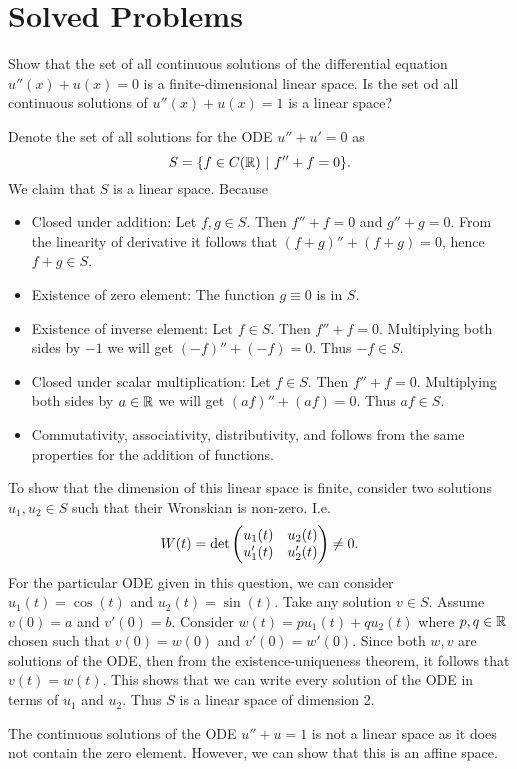 \section{Solved Problems}

\begin{problem}
	Show that the set of all continuous solutions of the differential equation $ u''(x) + u(x) = 0 $ is a finite-dimensional linear space. Is the set od all continuous solutions of $ u''(x)+u(x) = 1$ is a linear space?
\end{problem}
\begin{solution}
	Denote the set of all solutions for the ODE $ u'' + u' = 0 $ as 
	\[ S = \{f \in C(\mathbb{R})\ |\ f'' + f = 0\}. \]
	We claim that $ S $ is a linear space. Because
	\begin{itemize}[noitemsep]
		\item Closed under addition: Let $ f,g \in S $. Then $ f''+f = 0 $ and $ g'' + g = 0 $. From the linearity of derivative it follows that $ (f+g) '' + (f+g) = 0  $, hence $ f+g \in S $.
		\item Existence of zero element: The function $ g \equiv 0 $ is in $ S $.
		\item Existence of inverse element: Let $ f \in S $. Then $ f'' + f = 0 $. Multiplying both sides by $ -1 $ we will get $ (-f)'' + (-f) = 0 $. Thus $ -f \in S $.
		\item Closed under scalar multiplication:  Let $ f \in S $. Then $ f'' + f = 0 $. Multiplying both sides by $ a \in \mathbb{R} $ we will get $ (af)'' + (af) = 0 $. Thus $ af \in S $.
		\item Commutativity, associativity, distributivity, and  follows from the same properties for the addition of functions.
	\end{itemize}
	To show that the dimension of this linear space is finite, consider two solutions $ u_1, u_2 \in S $ such that their Wronskian is non-zero. I.e.
	\[ W(t) = \det\begin{pmatrix} u_1(t) & u_2(t) \\ u'_1(t) & u'_2(t) \end{pmatrix} \neq 0. \]
	For the particular ODE given in this question, we can consider $ u_1(t) = \cos(t) $ and $ u_2(t) = \sin(t) $. Take any solution $ v \in S $. Assume $ v(0) = a $ and $ v'(0) = b $. Consider $ w(t) = p u_1(t) + qu_2(t)$ where $ p,q\in \mathbb{R} $ chosen such that $ v(0) = w(0) $ and $ v'(0) = w'(0) $. Since both $ w,v $ are solutions of the ODE, then from the existence-uniqueness theorem, it follows that $ v(t) = w(t) $. This shows that we can write every solution of the ODE in terms of $ u_1 $ and $ u_2 $. Thus $ S $ is a linear space of dimension 2. 
	
	The continuous solutions of the ODE $ u'' + u = 1 $ is not a linear space as it does not contain the zero element. However, we can show that this is an affine space.
\end{solution}

